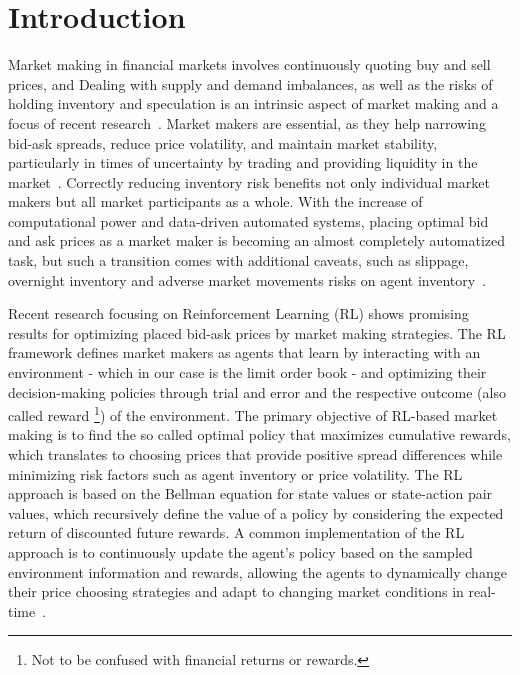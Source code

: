 \section{Introduction}
\label{sec:introduction}

Market making in financial markets involves continuously quoting buy and sell prices, and Dealing with supply and demand imbalances,
as well as the risks of holding inventory and speculation is an intrinsic aspect of market making and a focus of recent research~\cite{Cartea2015, Gasperov2021}.
Market makers are essential, as they help narrowing bid-ask spreads, reduce price volatility, and maintain market stability,
particularly in times of uncertainty by trading and providing liquidity in the market~\cite{Glosten1985, OHara1995}.
Correctly reducing inventory risk benefits not only individual market makers but all market participants as a whole.
With the increase of computational power and data-driven automated systems, placing optimal bid and ask prices as a market maker is becoming an almost completely automatized task,
but such a transition comes with additional caveats, such as slippage, overnight inventory and adverse market movements risks on agent inventory~\cite{Cartea2015, Avellaneda2008}.

Recent research focusing on Reinforcement Learning (RL) shows promising results for optimizing placed bid-ask prices by market making strategies.
The RL framework defines market makers as agents that learn by interacting with an environment - which in our case is the limit order book -
and optimizing their decision-making policies through trial and error and the respective outcome
(also called reward \footnote{Not to be confused with financial returns or rewards.}) of the environment.
The primary objective of RL-based market making is to find the so called optimal policy that maximizes cumulative rewards,
which translates to choosing prices that provide positive spread differences while minimizing risk factors such as agent inventory or price volatility.
The RL approach is based on the Bellman equation for state values or state-action pair values,
which recursively define the value of a policy by considering the expected return of discounted future rewards.
A common implementation of the RL approach is to continuously update the agent's policy based on the sampled environment information and rewards,
allowing the agents to dynamically change their price choosing strategies and adapt to changing market conditions in real-time~\cite{Sutton2018}.


